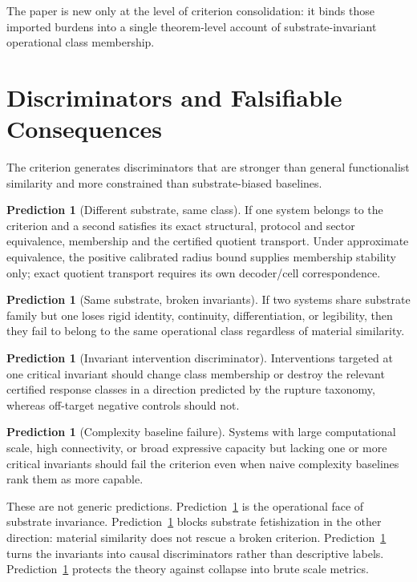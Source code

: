 \documentclass[11pt,a4paper]{article}
\theoremstyle{definition}
\newtheorem{prediction}[theorem]{Prediction}
\begin{document}
The paper is new only at the level of criterion consolidation: it binds those imported burdens into a single theorem-level account of substrate-invariant operational class membership.

\section{Discriminators and Falsifiable Consequences}
The criterion generates discriminators that are stronger than general functionalist similarity and more constrained than substrate-biased baselines.

\begin{prediction}[Different substrate, same class]\label{pred:sameclass}
If one system belongs to the criterion and a second satisfies its exact structural, protocol and sector equivalence, membership and the certified quotient transport. Under approximate equivalence, the positive calibrated radius bound supplies membership stability only; exact quotient transport requires its own decoder/cell correspondence.
\end{prediction}

\begin{prediction}[Same substrate, broken invariants]\label{pred:breakclass}
If two systems share substrate family but one loses rigid identity, continuity, differentiation, or legibility, then they fail to belong to the same operational class regardless of material similarity.
\end{prediction}

\begin{prediction}[Invariant intervention discriminator]\label{pred:intervention}
Interventions targeted at one critical invariant should change class membership or destroy the relevant certified response classes in a direction predicted by the rupture taxonomy, whereas off-target negative controls should not.
\end{prediction}

\begin{prediction}[Complexity baseline failure]\label{pred:complexity}
Systems with large computational scale, high connectivity, or broad expressive capacity but lacking one or more critical invariants should fail the criterion even when naive complexity baselines rank them as more capable.
\end{prediction}

These are not generic predictions. Prediction~\ref{pred:sameclass} is the operational face of substrate invariance. Prediction~\ref{pred:breakclass} blocks substrate fetishization in the other direction: material similarity does not rescue a broken criterion. Prediction~\ref{pred:intervention} turns the invariants into causal discriminators rather than descriptive labels. Prediction~\ref{pred:complexity} protects the theory against collapse into brute scale metrics.
\end{document}
